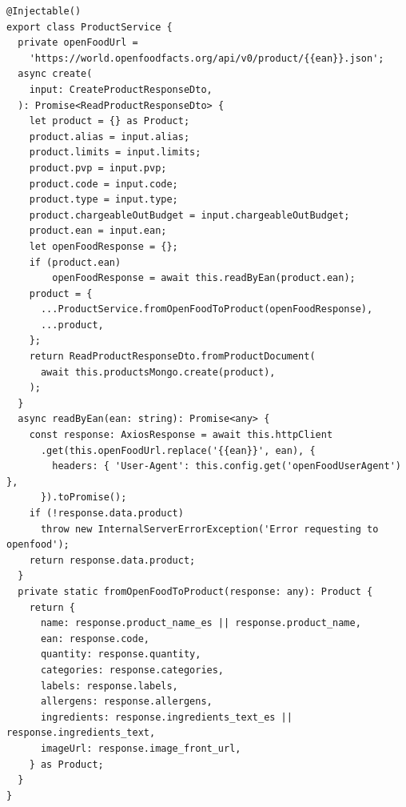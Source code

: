 \begin{lstlisting}[caption={Product service: Añadir producto nuevo},label=cod:service-product-create-product]
@Injectable()
export class ProductService {
  private openFoodUrl =
    'https://world.openfoodfacts.org/api/v0/product/{{ean}}.json';
  async create(
    input: CreateProductResponseDto,
  ): Promise<ReadProductResponseDto> {
    let product = {} as Product;
    product.alias = input.alias;
    product.limits = input.limits;
    product.pvp = input.pvp;
    product.code = input.code;
    product.type = input.type;
    product.chargeableOutBudget = input.chargeableOutBudget;
    product.ean = input.ean;
    let openFoodResponse = {};
    if (product.ean)
        openFoodResponse = await this.readByEan(product.ean);
    product = {
      ...ProductService.fromOpenFoodToProduct(openFoodResponse),
      ...product,
    };
    return ReadProductResponseDto.fromProductDocument(
      await this.productsMongo.create(product),
    );
  }
  async readByEan(ean: string): Promise<any> {
    const response: AxiosResponse = await this.httpClient
      .get(this.openFoodUrl.replace('{{ean}}', ean), {
        headers: { 'User-Agent': this.config.get('openFoodUserAgent') },
      }).toPromise();
    if (!response.data.product)
      throw new InternalServerErrorException('Error requesting to openfood');
    return response.data.product;
  }
  private static fromOpenFoodToProduct(response: any): Product {
    return {
      name: response.product_name_es || response.product_name,
      ean: response.code,
      quantity: response.quantity,
      categories: response.categories,
      labels: response.labels,
      allergens: response.allergens,
      ingredients: response.ingredients_text_es || response.ingredients_text,
      imageUrl: response.image_front_url,
    } as Product;
  }
}
\end{lstlisting}
\clearpage

